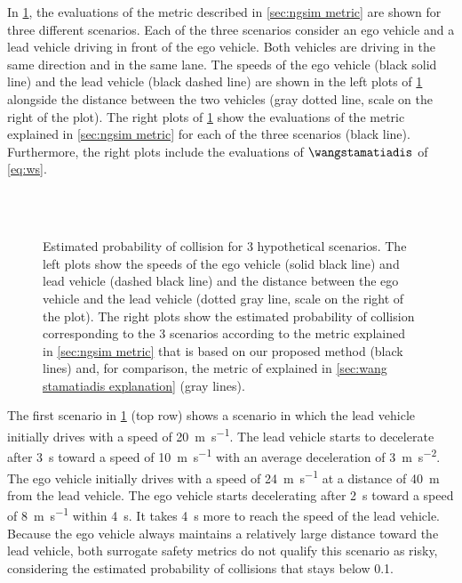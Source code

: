 In \cref{fig:scenarios}, the evaluations of the metric described in \cref{sec:ngsim metric} are shown for three different scenarios. 
Each of the three scenarios consider an ego vehicle and a lead vehicle driving in front of the ego vehicle.
Both vehicles are driving in the same direction and in the same lane. 
The speeds of the ego vehicle (black solid line) and the lead vehicle (black dashed line) are shown in the left plots of \cref{fig:scenarios} alongside the distance between the two vehicles (gray dotted line, scale on the right of the plot).
The right plots of \cref{fig:scenarios} show the evaluations of the metric explained in \cref{sec:ngsim metric} for each of the three scenarios (black line).
Furthermore, the right plots include the evaluations of $\wangstamatiadis$ of \cref{eq:ws}.

\setlength{\figurewidth}{.45\linewidth}
\setlength{\figureheight}{0.6\figurewidth}
\begin{figure}
	\centering
	
	\\
	
	\\
	
	
	\caption{Estimated probability of collision for 3 hypothetical scenarios. 
		The left plots show the speeds of the ego vehicle (solid black line) and lead vehicle (dashed black line) and the distance between the ego vehicle and the lead vehicle (dotted gray line, scale on the right of the plot).
		The right plots show the estimated probability of collision corresponding to the 3 scenarios according to the metric explained in \cref{sec:ngsim metric} that is based on our proposed method (black lines) and, for comparison, the metric of \textcite{wang2014evaluation} explained in \cref{sec:wang stamatiadis explanation} (gray lines).}
	\label{fig:scenarios}		
\end{figure}

The first scenario in \cref{fig:scenarios} (top row) shows a scenario in which the lead vehicle initially drives with a speed of \SI{20}{\meter\per\second}.
The lead vehicle starts to decelerate after \SI{3}{\second} toward a speed of \SI{10}{\meter\per\second} with an average deceleration of \SI{3}{\meter\per\second\squared}.
The ego vehicle initially drives with a speed of \SI{24}{\meter\per\second} at a distance of \SI{40}{\meter} from the lead vehicle.
The ego vehicle starts decelerating after \SI{2}{\second} toward a speed of \SI{8}{\meter\per\second} within \SI{4}{\second}.
It takes \SI{4}{\second} more to reach the speed of the lead vehicle.
Because the ego vehicle always maintains a relatively large distance toward the lead vehicle, both surrogate safety metrics do not qualify this scenario as risky, considering the estimated probability of collisions that stays below 0.1.

